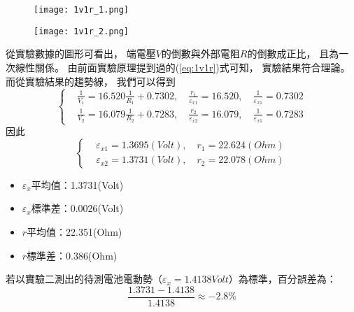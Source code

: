\documentclass[12pt]{article}
\begin{document}
                \begin{figure}[h]
                    \begin{minipage}{0.99\textwidth}
                        \centering

                        \texttt{[image: 1v1r\_1.png]}
                        \caption{}
                        \label{fig:1v1r_1}
                    \end{minipage}
                    \begin{minipage}{0.99\textwidth}
                        \centering

                        \texttt{[image: 1v1r\_2.png]}
                        \caption{}
                        \label{fig:1v1r_2}
                    \end{minipage}
                \end{figure}

                從實驗數據的圖形可看出，
                端電壓$V$的倒數與外部電阻$R$的倒數成正比，
                且為一次線性關係。
                由前面實驗原理提到過的(\ref{eq:1v1r})式可知，
                實驗結果符合理論。
                而從實驗結果的趨勢線，
                我們可以得到
                $$
                \begin{cases}
                    &\frac{1}{V_1}=16.520 \frac{1}{R_1} + 0.7302,\quad \frac{r_1}{\varepsilon_{x1}}=16.520,\quad \frac{1}{\varepsilon_{x1}}=0.7302\\
                    &\frac{1}{V_2}=16.079 \frac{1}{R_2} + 0.7283,\quad \frac{r_2}{\varepsilon_{x2}}=16.079,\quad \frac{1}{\varepsilon_{x1}}=0.7283
                \end{cases}
                $$
                \noindent 因此
                $$
                \begin{cases}
                    &\varepsilon_{x1}=1.3695(Volt), \quad r_1 = 22.624(Ohm)\\
                    &\varepsilon_{x2}=1.3731(Volt), \quad r_2 = 22.078(Ohm)
                \end{cases}
                $$
                \begin{itemize}
                    \item $\varepsilon_x$平均值：1.3731(Volt)
                    \item $\varepsilon_x$標準差：0.0026(Volt)
                    \item $r$平均值：22.351(Ohm)
                    \item $r$標準差：0.386(Ohm)
                \end{itemize}
                若以實驗二測出的待測電池電動勢（$\varepsilon_x=1.4138Volt$）為標準，百分誤差為：
                $$\frac{1.3731-1.4138}{1.4138}\approx -2.8\%$$
\end{document}
